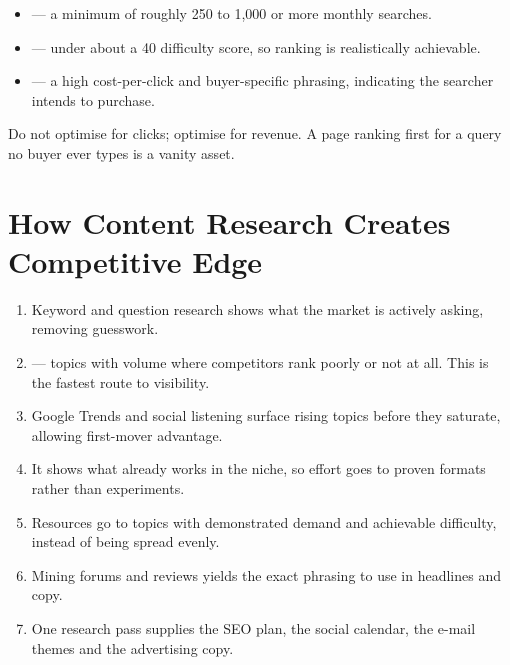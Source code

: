 \documentclass{MMTextbook}
\begin{document}
\begin{itemize}
\item {} --- a minimum of roughly 250 to 1,000 or more
      monthly searches.
\item {} --- under about a 40 difficulty score, so ranking
      is realistically achievable.
\item {} --- a high cost-per-click and buyer-specific
      phrasing, indicating the searcher intends to purchase.
\end{itemize}

\begin{warnbox}
Do not optimise for clicks; optimise for revenue. A page ranking first for a
query no buyer ever types is a vanity asset.
\end{warnbox}

\section{How Content Research Creates Competitive Edge}

\begin{exambox}
\begin{enumerate}
\item {} Keyword and question research
      shows what the market is actively asking, removing guesswork.
\item {} --- topics with volume where competitors rank
      poorly or not at all. This is the fastest route to visibility.
\item {} Google Trends and social listening surface
      rising topics before they saturate, allowing first-mover advantage.
\item {} It shows what already works in the
      niche, so effort goes to proven formats rather than experiments.
\item {} Resources go to topics with demonstrated demand and
      achievable difficulty, instead of being spread evenly.
\item {} Mining forums and reviews
      yields the exact phrasing to use in headlines and copy.
\item {} One research pass supplies the SEO plan,
      the social calendar, the e-mail themes and the advertising copy.
\end{enumerate}
\end{exambox}
\end{document}

